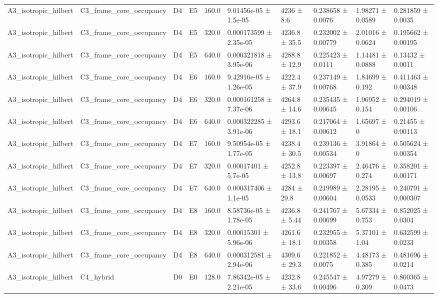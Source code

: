 \begin{table}
\begin{tabular}{llllllllll}
A3\_isotropic\_hilbert & C3\_frame\_core\_occupancy & D4 & E5 & 160.0 & 9.01456e-05 ± 1.5e-05 & 4236 ± 8.6 & 0.238658 ± 0.0076 & 1.98271 ± 0.0589 & 0.281859 ± 0.0035 \\
A3\_isotropic\_hilbert & C3\_frame\_core\_occupancy & D4 & E5 & 320.0 & 0.000173599 ± 2.35e-05 & 4236.8 ± 35.5 & 0.232002 ± 0.00779 & 2.01016 ± 0.0624 & 0.195662 ± 0.00195 \\
A3\_isotropic\_hilbert & C3\_frame\_core\_occupancy & D4 & E5 & 640.0 & 0.000321818 ± 3.95e-06 & 4288.8 ± 12.9 & 0.225423 ± 0.0111 & 1.14481 ± 0.0888 & 0.13432 ± 0.0011 \\
A3\_isotropic\_hilbert & C3\_frame\_core\_occupancy & D4 & E6 & 160.0 & 9.42916e-05 ± 1.26e-05 & 4222.4 ± 37.9 & 0.237149 ± 0.00768 & 1.84699 ± 0.192 & 0.411463 ± 0.00348 \\
A3\_isotropic\_hilbert & C3\_frame\_core\_occupancy & D4 & E6 & 320.0 & 0.000161258 ± 7.37e-06 & 4264.8 ± 14.6 & 0.235435 ± 0.00645 & 1.96952 ± 0.154 & 0.294019 ± 0.00106 \\
A3\_isotropic\_hilbert & C3\_frame\_core\_occupancy & D4 & E6 & 640.0 & 0.000322285 ± 3.91e-06 & 4293.6 ± 18.1 & 0.217064 ± 0.00612 & 1.65697 ± 0 & 0.21455 ± 0.00113 \\
A3\_isotropic\_hilbert & C3\_frame\_core\_occupancy & D4 & E7 & 160.0 & 9.50954e-05 ± 1.77e-05 & 4238.4 ± 30.5 & 0.239136 ± 0.00534 & 3.91864 ± 0 & 0.505624 ± 0.00354 \\
A3\_isotropic\_hilbert & C3\_frame\_core\_occupancy & D4 & E7 & 320.0 & 0.00017401 ± 5.7e-05 & 4252.8 ± 13.8 & 0.223397 ± 0.00697 & 2.46476 ± 0.274 & 0.358201 ± 0.00171 \\
A3\_isotropic\_hilbert & C3\_frame\_core\_occupancy & D4 & E7 & 640.0 & 0.000317406 ± 1.1e-05 & 4284 ± 29.8 & 0.219989 ± 0.00604 & 2.28195 ± 0.0533 & 0.240791 ± 0.000307 \\
A3\_isotropic\_hilbert & C3\_frame\_core\_occupancy & D4 & E8 & 160.0 & 8.58736e-05 ± 1.78e-05 & 4236.8 ± 5.44 & 0.241767 ± 0.00699 & 5.67334 ± 0.753 & 0.852025 ± 0.0304 \\
A3\_isotropic\_hilbert & C3\_frame\_core\_occupancy & D4 & E8 & 320.0 & 0.00015301 ± 5.96e-06 & 4261.6 ± 18.1 & 0.232955 ± 0.00358 & 5.37101 ± 1.04 & 0.632599 ± 0.0233 \\
A3\_isotropic\_hilbert & C3\_frame\_core\_occupancy & D4 & E8 & 640.0 & 0.000312581 ± 2.94e-06 & 4309.6 ± 29.3 & 0.221852 ± 0.0075 & 4.48173 ± 0.385 & 0.481696 ± 0.0214 \\
A3\_isotropic\_hilbert & C4\_hybrid & D0 & E0 & 128.0 & 7.86342e-05 ± 2.21e-05 & 4232.8 ± 33.6 & 0.245547 ± 0.00496 & 4.97279 ± 0.309 & 0.860365 ± 0.0473 \\

\end{tabular}
\end{table}
